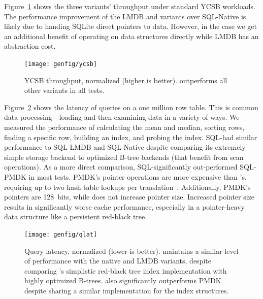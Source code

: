 {    Figure~\ref{fig:ycsb} shows the three variants' throughput under standard YCSB
    workloads. The performance improvement of the LMDB and \Twizzler variants over SQL-Native is
    likely due to handing SQLite direct pointers to data. However, in the \Twizzler
    case we get an additional benefit of operating on data structures directly while LMDB has an
    abstraction cost.

    \begin{figure}
        \centering
        \texttt{[image: genfig/ycsb]}
        \caption{YCSB throughput, normalized (higher is better). \Twizzler outperforms all other
            variants in all tests.}
        \label{fig:ycsb}
    \end{figure}

    Figure~\ref{fig:qlat} shows the latency of queries on a one million row table.
    This is common data processing---loading and then
    examining data in a variety of ways.
    We measured the performance
    of calculating the mean and median, sorting rows, finding a specific row,
    building an index, and probing the index. SQL-\Twizzler had similar performance to SQL-LMDB and
    SQL-Native despite comparing its extremely simple storage backend to optimized B-tree
    backends (that benefit from scan operations). As a more direct comparison,
    SQL-\Twizzler significantly out-performed SQL-PMDK in most tests. PMDK's pointer operations are
    more expensive than \Twizzler's, requiring up to two hash table lookups per
    translation~\cite{pmdk-pointers}. Additionally, PMDK's
    pointers are 128~bits, while \Twizzler does not increase pointer size. Increased
    pointer size results in significantly worse cache performance, especially in a pointer-heavy data
    structure like a persistent red-black tree.



    \begin{figure}
        \centering
        \texttt{[image: genfig/qlat]}
        \caption{Query latency, normalized (lower is better). \Twizzler maintains a similar level of
            performance with the native and LMDB variants, despite comparing \Twizzler's simplistic
            red-black tree index
            implementation with highly optimized B-trees. \Twizzler also significantly outperforms PMDK
            despite sharing a similar implementation for the index structures.}
        \label{fig:qlat}
    \end{figure}


}
